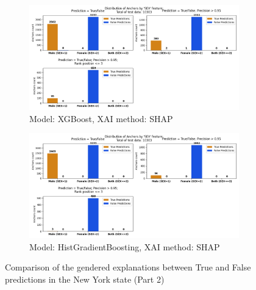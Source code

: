 \begin{figure}[h]
    \ContinuedFloat
    \begin{subfigure}[b]{0.9\textwidth}
        \includegraphics[width=\textwidth]{Images/distribution_folktables/pca_xg_ny_shap.png}
        \caption{Model: XGBoost, XAI method: SHAP}
        \label{fig:distr_xg_ny_shap}
    \end{subfigure}
    \hfill
    \begin{subfigure}[b]{0.9\textwidth}
        \includegraphics[width=\textwidth]{Images/distribution_folktables/pca_skrub_ny_shap.png}
        \caption{Model: HistGradientBoosting, XAI method: SHAP}
        \label{fig:distr_skrub_ny_shap}
    \end{subfigure}
    \caption{Comparison of the gendered explanations between True and False predictions in the New York state (Part 2)}
    \label{fig:distr_ny}
\end{figure}